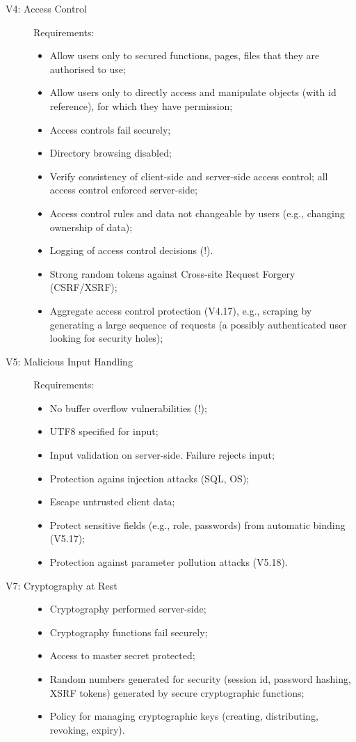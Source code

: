 \documentclass{report}
\begin{document}
\begin{description}
\item[V4: Access Control] Requirements:
\begin{itemize}
\item Allow users only to secured functions, pages, files that they are authorised to use;
\item Allow users only to directly access and manipulate objects (with id reference),
for which they have permission;
\item Access controls fail securely;
\item Directory browsing disabled;
\item Verify consistency of client-side and server-side access control;
all access control enforced server-side;
\item Access control rules and data not changeable by users (e.g., changing ownership of data);
\item Logging of access control decisions (!).
\item Strong random tokens against Cross-site Request Forgery (CSRF/XSRF);
\item Aggregate access control protection  (V4.17), e.g., scraping by generating 
a large sequence of requests (a possibly authenticated user looking for security holes);
\end{itemize}



\item[V5: Malicious Input Handling] Requirements:
\begin{itemize}
\item No buffer overflow vulnerabilities (!);
\item UTF8 specified for input;
\item Input validation on server-side. Failure rejects input;
\item Protection agains injection attacks (SQL, OS);
\item Escape untrusted client data;
\item Protect sensitive fields (e.g., role, passwords) from automatic binding (V5.17);
\item Protection against parameter pollution attacks (V5.18).
\end{itemize}

\item[V7: Cryptography at Rest]
\begin{itemize}
\item Cryptography performed server-side;
\item Cryptography functions fail securely;
\item Access to master secret protected;
\item Random numbers generated for security (session id, password hashing,
XSRF tokens) generated by secure cryptographic functions;
\item Policy for managing cryptographic keys (creating, distributing, revoking, expiry).
\end{itemize}


\end{description}
\end{document}
